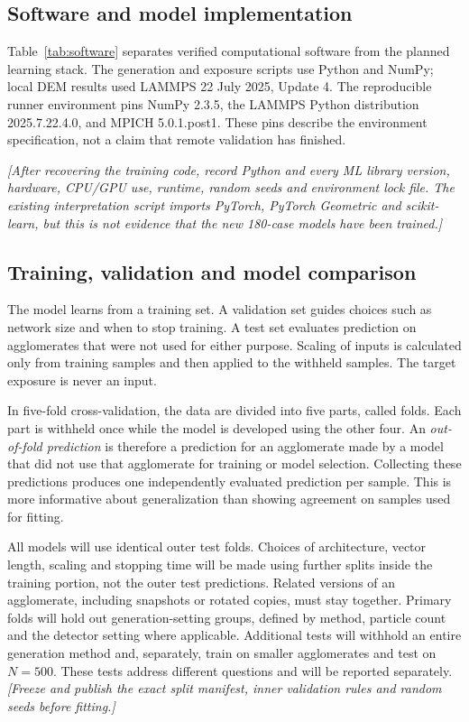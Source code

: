 \documentclass[11pt,a4paper]{article}
\newcommand{\pending}[1]{{\color{red}\textit{[#1]}}}
\begin{document}
\subsection{Software and model implementation}
Table~\ref{tab:software} separates verified computational software from the planned learning stack. The generation and exposure scripts use Python and NumPy; local DEM results used LAMMPS 22 July 2025, Update 4. The reproducible runner environment pins NumPy 2.3.5, the LAMMPS Python distribution 2025.7.22.4.0, and MPICH 5.0.1.post1. These pins describe the environment specification, not a claim that remote validation has finished.

\pending{After recovering the training code, record Python and every ML library version, hardware, CPU/GPU use, runtime, random seeds and environment lock file. The existing interpretation script imports PyTorch, PyTorch Geometric and scikit-learn, but this is not evidence that the new 180-case models have been trained.}

\subsection{Training, validation and model comparison}
The model learns from a training set. A validation set guides choices such as network size and when to stop training. A test set evaluates prediction on agglomerates that were not used for either purpose. Scaling of inputs is calculated only from training samples and then applied to the withheld samples. The target exposure is never an input.

In five-fold cross-validation, the data are divided into five parts, called folds. Each part is withheld once while the model is developed using the other four. An \emph{out-of-fold prediction} is therefore a prediction for an agglomerate made by a model that did not use that agglomerate for training or model selection. Collecting these predictions produces one independently evaluated prediction per sample. This is more informative about generalization than showing agreement on samples used for fitting.

All models will use identical outer test folds. Choices of architecture, vector length, scaling and stopping time will be made using further splits inside the training portion, not the outer test predictions. Related versions of an agglomerate, including snapshots or rotated copies, must stay together. Primary folds will hold out generation-setting groups, defined by method, particle count and the detector setting where applicable. Additional tests will withhold an entire generation method and, separately, train on smaller agglomerates and test on $N=500$. These tests address different questions and will be reported separately. \pending{Freeze and publish the exact split manifest, inner validation rules and random seeds before fitting.}
\end{document}
